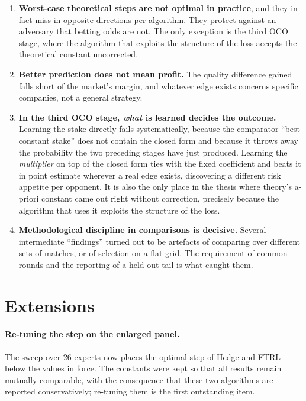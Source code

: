 \documentclass[12pt,a4paper,oneside]{report}
\renewcommand{\_}{\oldunderscore\allowbreak}
\theoremstyle{definition}
\theoremstyle{plain}
\theoremstyle{remark}
\begin{document}
\begin{enumerate}
  \item \textbf{Worst-case theoretical steps are not optimal in practice}, and they in fact miss in
        opposite directions per algorithm. They protect against an adversary that betting odds are
        not. The only exception is the third OCO stage, where the algorithm that exploits the
        structure of the loss accepts the theoretical constant uncorrected.

  \item \textbf{Better prediction does not mean profit.} The quality difference gained falls short
        of the market's margin, and whatever edge exists concerns specific companies, not a general
        strategy.

  \item \textbf{In the third OCO stage, \emph{what} is learned decides the outcome.} Learning the
        stake directly fails systematically, because the comparator ``best constant stake'' does
        not contain the closed form and because it throws away the probability the two preceding
        stages have just produced. Learning the \emph{multiplier} on top of the closed form ties
        with the fixed coefficient and beats it in point estimate wherever a real edge exists,
        discovering a different risk appetite per opponent. It is also the only place in the thesis
        where theory's a-priori constant came out right without correction, precisely because the
        algorithm that uses it exploits the structure of the loss.

  \item \textbf{Methodological discipline in comparisons is decisive.} Several intermediate
        ``findings'' turned out to be artefacts of comparing over different sets of matches, or of
        selection on a flat grid. The requirement of common rounds and the reporting of a held-out
        tail is what caught them.
\end{enumerate}

\section{Extensions}

\paragraph{Re-tuning the step on the enlarged panel.} The sweep over 26 experts now places the
optimal step of Hedge and FTRL below the values in force. The constants were kept so that all
results remain mutually comparable, with the consequence that these two algorithms are reported
conservatively; re-tuning them is the first outstanding item.
\end{document}
